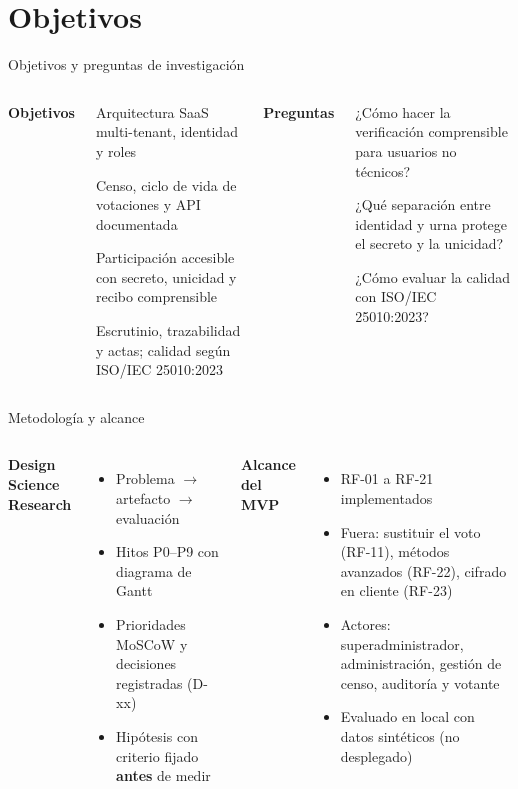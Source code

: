 \documentclass[aspectratio=169,11pt]{beamer}
\begin{document}
\section{Objetivos}
\begin{frame}{Objetivos y preguntas de investigación}
  \begin{columns}[T]
    \textbf{Objetivos}
    \begin{description}\footnotesize
      \item[OBJ-1] Arquitectura SaaS multi-tenant, identidad y roles
      \item[OBJ-2] Censo, ciclo de vida de votaciones y API documentada
      \item[OBJ-3] Participación accesible con secreto, unicidad y recibo comprensible
      \item[OBJ-4] Escrutinio, trazabilidad y actas; calidad según ISO/IEC 25010:2023
    \end{description}
    \textbf{Preguntas}
    \begin{description}\footnotesize
      \item[RQ1] ¿Cómo hacer la verificación comprensible para usuarios no técnicos?
      \item[RQ2] ¿Qué separación entre identidad y urna protege el secreto y la unicidad?
      \item[RQ3] ¿Cómo evaluar la calidad con ISO/IEC 25010:2023?
    \end{description}
  \end{columns}
\end{frame}

\begin{frame}{Metodología y alcance}
  \begin{columns}[T]
    \textbf{Design Science Research}
    \begin{itemize}\small
      \item Problema \(\rightarrow\) artefacto \(\rightarrow\) evaluación
      \item Hitos P0--P9 con diagrama de Gantt
      \item Prioridades MoSCoW y decisiones registradas (D-xx)
      \item Hipótesis con criterio fijado \textbf{antes} de medir
    \end{itemize}
    \textbf{Alcance del MVP}
    \begin{itemize}\small
      \item RF-01 a RF-21 implementados
      \item Fuera: sustituir el voto (RF-11), métodos avanzados (RF-22), cifrado en cliente (RF-23)
      \item Actores: superadministrador, administración, gestión de censo, auditoría y votante
      \item Evaluado en local con datos sintéticos (no desplegado)
    \end{itemize}
  \end{columns}
\end{frame}
\end{document}
